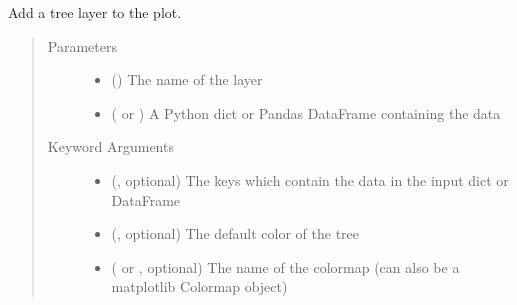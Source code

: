 \documentclass[letterpaper,10pt,english]{sphinxmanual}
\begin{document}
\begin{fulllineitems}
\begin{fulllineitems}
\begin{quote}
\begin{description}
\end{description}\end{quote}

\end{fulllineitems}


\begin{fulllineitems}
\label{\detokenize{documentation:faerun.Faerun.add_tree}}
Add a tree layer to the plot.
\begin{quote}\begin{description}
\item[{Parameters}] \leavevmode\begin{itemize}
\item {} 
 () \textendash{} The name of the layer

\item {} 
 ( or ) \textendash{} A Python dict or Pandas DataFrame containing the data

\end{itemize}

\item[{Keyword Arguments}] \leavevmode\begin{itemize}
\item {} 
 (, optional) \textendash{} The keys which contain the data in the input dict or DataFrame

\item {} 
 (, optional) \textendash{} The default color of the tree

\item {} 
 ( or , optional) \textendash{} The name of the colormap (can also be a matplotlib Colormap object)


\end{itemize}
\end{description}
\end{quote}
\end{fulllineitems}
\end{fulllineitems}
\end{document}
